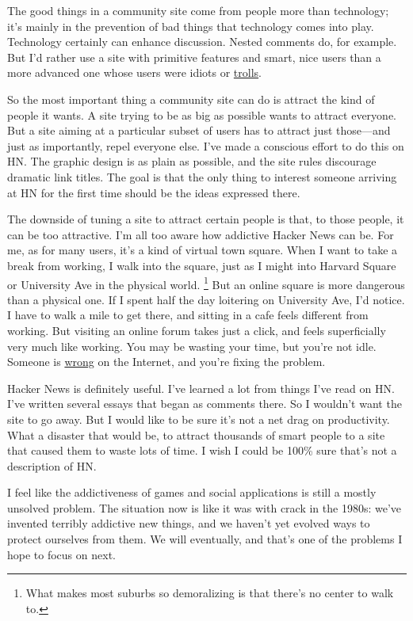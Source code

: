 \documentclass[12pt]{book}
\begin{document}
The good things in a community site come from people more than
technology; it's mainly in the prevention of bad things that technology
comes into play. Technology certainly can enhance discussion. Nested
comments do, for example. But I'd rather use a site with primitive
features and smart, nice users than a more advanced one whose users were
idiots or \href{trolls.html}{trolls}.

So the most important thing a community site can do is attract the kind
of people it wants. A site trying to be as big as possible wants to
attract everyone. But a site aiming at a particular subset of users has
to attract just those---and just as importantly, repel everyone else.
I've made a conscious effort to do this on HN. The graphic design is as
plain as possible, and the site rules discourage dramatic link titles.
The goal is that the only thing to interest someone arriving at HN for
the first time should be the ideas expressed there.

The downside of tuning a site to attract certain people is that, to
those people, it can be too attractive. I'm all too aware how addictive
Hacker News can be. For me, as for many users, it's a kind of virtual
town square. When I want to take a break from working, I walk into the
square, just as I might into Harvard Square or University Ave in the
physical world. \footnote{What makes most suburbs so demoralizing is that there's no
center to walk to.} But an online square is more
dangerous than a physical one. If I spent half the day loitering on
University Ave, I'd notice. I have to walk a mile to get there, and
sitting in a cafe feels different from working. But visiting an online
forum takes just a click, and feels superficially very much like
working. You may be wasting your time, but you're not idle. Someone is
\href{http://xkcd.com/386/}{wrong} on the Internet, and you're fixing
the problem.

Hacker News is definitely useful. I've learned a lot from things I've
read on HN. I've written several essays that began as comments there. So
I wouldn't want the site to go away. But I would like to be sure it's
not a net drag on productivity. What a disaster that would be, to
attract thousands of smart people to a site that caused them to waste
lots of time. I wish I could be 100\% sure that's not a description of
HN.

I feel like the addictiveness of games and social applications is still
a mostly unsolved problem. The situation now is like it was with crack
in the 1980s: we've invented terribly addictive new things, and we
haven't yet evolved ways to protect ourselves from them. We will
eventually, and that's one of the problems I hope to focus on next.
\end{document}
